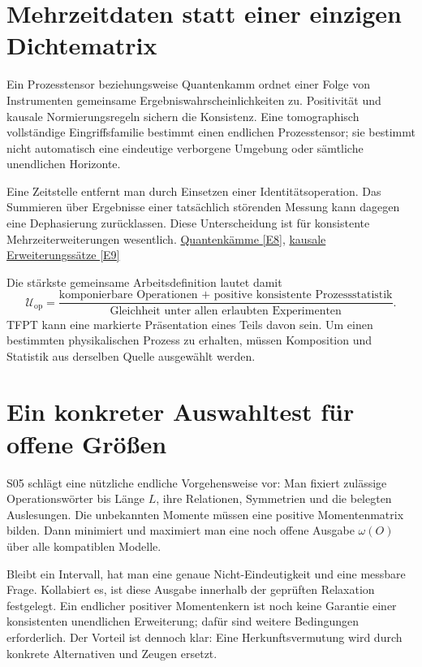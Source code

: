 \section{Mehrzeitdaten statt einer einzigen Dichtematrix}
Ein Prozesstensor beziehungsweise Quantenkamm ordnet einer Folge von Instrumenten gemeinsame Ergebniswahrscheinlichkeiten zu. Positivität und kausale Normierungsregeln sichern die Konsistenz. Eine tomographisch vollständige Eingriffsfamilie bestimmt einen endlichen Prozesstensor; sie bestimmt nicht automatisch eine eindeutige verborgene Umgebung oder sämtliche unendlichen Horizonte.

Eine Zeitstelle entfernt man durch Einsetzen einer Identitätsoperation. Das Summieren über Ergebnisse einer tatsächlich störenden Messung kann dagegen eine Dephasierung zurücklassen. Diese Unterscheidung ist für konsistente Mehrzeiterweiterungen wesentlich. \href{https://arxiv.org/abs/0904.4483}{Quantenkämme [E8]}, \href{https://arxiv.org/abs/1712.02589}{kausale Erweiterungssätze [E9]}

Die stärkste gemeinsame Arbeitsdefinition lautet damit
\begin{equation}
\mathcal U_{\mathrm{op}}=
\frac{\text{komponierbare Operationen + positive konsistente Prozessstatistik}}
{\text{Gleichheit unter allen erlaubten Experimenten}}.
\end{equation}
TFPT kann eine markierte Präsentation eines Teils davon sein. Um einen bestimmten physikalischen Prozess zu erhalten, müssen Komposition und Statistik aus derselben Quelle ausgewählt werden.

\section{Ein konkreter Auswahltest für offene Größen}
S05 schlägt eine nützliche endliche Vorgehensweise vor: Man fixiert zulässige Operationswörter bis Länge $L$, ihre Relationen, Symmetrien und die belegten Auslesungen. Die unbekannten Momente müssen eine positive Momentenmatrix bilden. Dann minimiert und maximiert man eine noch offene Ausgabe $\omega(O)$ über alle kompatiblen Modelle.

Bleibt ein Intervall, hat man eine genaue Nicht-Eindeutigkeit und eine messbare Frage. Kollabiert es, ist diese Ausgabe innerhalb der geprüften Relaxation festgelegt. Ein endlicher positiver Momentenkern ist noch keine Garantie einer konsistenten unendlichen Erweiterung; dafür sind weitere Bedingungen erforderlich. Der Vorteil ist dennoch klar: Eine Herkunftsvermutung wird durch konkrete Alternativen und Zeugen ersetzt.

